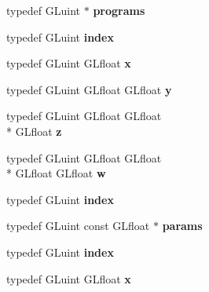 \begin{DoxyCompactItemize}
\item 
\hypertarget{class_c_p_v_r_tgles_ext_a30029eb3ece83adb539256f65c283d9d}{typedef G\+Luint $\ast$ {\bfseries programs}}\label{class_c_p_v_r_tgles_ext_a30029eb3ece83adb539256f65c283d9d}

\item 
\hypertarget{class_c_p_v_r_tgles_ext_a8c371b922a8940951930ac226e844106}{typedef G\+Luint {\bfseries index}}\label{class_c_p_v_r_tgles_ext_a8c371b922a8940951930ac226e844106}

\item 
\hypertarget{class_c_p_v_r_tgles_ext_aeb868dc0c00008f3df41424978e74b52}{typedef G\+Luint G\+Lfloat {\bfseries x}}\label{class_c_p_v_r_tgles_ext_aeb868dc0c00008f3df41424978e74b52}

\item 
\hypertarget{class_c_p_v_r_tgles_ext_a01d2cc93f26c9ccb6a063172122627f8}{typedef G\+Luint G\+Lfloat G\+Lfloat {\bfseries y}}\label{class_c_p_v_r_tgles_ext_a01d2cc93f26c9ccb6a063172122627f8}

\item 
\hypertarget{class_c_p_v_r_tgles_ext_a4eeafad74af90d765d30d7d1c129c7ef}{typedef G\+Luint G\+Lfloat G\+Lfloat \\*
G\+Lfloat {\bfseries z}}\label{class_c_p_v_r_tgles_ext_a4eeafad74af90d765d30d7d1c129c7ef}

\item 
\hypertarget{class_c_p_v_r_tgles_ext_a26510c8cc4b657be6a70257c8b035371}{typedef G\+Luint G\+Lfloat G\+Lfloat \\*
G\+Lfloat G\+Lfloat {\bfseries w}}\label{class_c_p_v_r_tgles_ext_a26510c8cc4b657be6a70257c8b035371}

\item 
\hypertarget{class_c_p_v_r_tgles_ext_a8c371b922a8940951930ac226e844106}{typedef G\+Luint {\bfseries index}}\label{class_c_p_v_r_tgles_ext_a8c371b922a8940951930ac226e844106}

\item 
\hypertarget{class_c_p_v_r_tgles_ext_a7e63e0aa709a61f5dcd282866a4504f4}{typedef G\+Luint const G\+Lfloat $\ast$ {\bfseries params}}\label{class_c_p_v_r_tgles_ext_a7e63e0aa709a61f5dcd282866a4504f4}

\item 
\hypertarget{class_c_p_v_r_tgles_ext_a8c371b922a8940951930ac226e844106}{typedef G\+Luint {\bfseries index}}\label{class_c_p_v_r_tgles_ext_a8c371b922a8940951930ac226e844106}

\item 
\hypertarget{class_c_p_v_r_tgles_ext_aeb868dc0c00008f3df41424978e74b52}{typedef G\+Luint G\+Lfloat {\bfseries x}}\label{class_c_p_v_r_tgles_ext_aeb868dc0c00008f3df41424978e74b52}


\end{DoxyCompactItemize}
